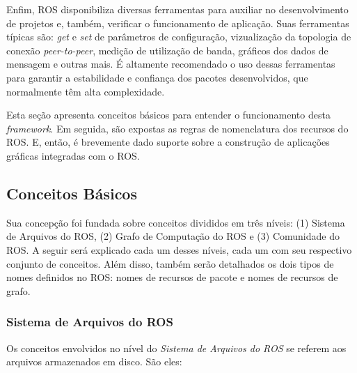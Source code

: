         Enfim, ROS disponibiliza diversas ferramentas para auxiliar no desenvolvimento de projetos e, também, verificar o funcionamento de aplicação. Suas ferramentas típicas são: \textit{get} e \textit{set} de parâmetros de configuração, vizualização da topologia de conexão \textit{peer-to-peer}, medição de utilização de banda, gráficos dos dados de mensagem e outras mais. É altamente recomendado o uso dessas ferramentas para garantir a estabilidade e confiança dos pacotes desenvolvidos, que normalmente têm alta complexidade.
        
        Esta seção apresenta conceitos básicos para entender o funcionamento desta \textit{framework}. Em seguida, são expostas as regras de nomenclatura dos recursos do ROS. E, então, é brevemente dado suporte sobre a construção de aplicações gráficas integradas com o ROS.
        
        \subsection{Conceitos Básicos} \label{subsec:ros_conceitos}
            Sua concepção foi fundada sobre conceitos divididos em três níveis: (1) Sistema de Arquivos do ROS, (2) Grafo de Computação do ROS e (3) Comunidade do ROS. A seguir será explicado cada um desses níveis, cada um com seu respectivo conjunto de conceitos. Além disso, também serão detalhados os dois tipos de nomes definidos no ROS: nomes de recursos de pacote e nomes de recursos de grafo.
            
            \subsubsection{Sistema de Arquivos do ROS} \label{subsubsec:ros_arquivos}
                Os conceitos envolvidos no nível do \textit{Sistema de Arquivos do ROS} se referem aos arquivos armazenados em disco. São eles:
                
